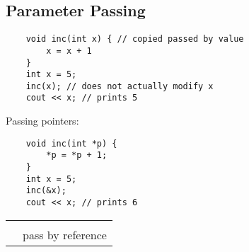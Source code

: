 \subsection{Parameter Passing}
\begin{lstlisting}
    void inc(int x) { // copied passed by value
        x = x + 1
    }
    int x = 5;
    inc(x); // does not actually modify x
    cout << x; // prints 5
\end{lstlisting}
Passing pointers:
\begin{lstlisting}
    void inc(int *p) {
        *p = *p + 1;
    }
    int x = 5;
    inc(&x);
    cout << x; // prints 6
\end{lstlisting}
\begin{table}[ht]\centering
      \begin{tabularx}{0.5\linewidth}{@{}YY@{}}
             &              \\
            \midrule
                                        &  \\
                                        & pass by reference
      \end{tabularx}
\end{table}
